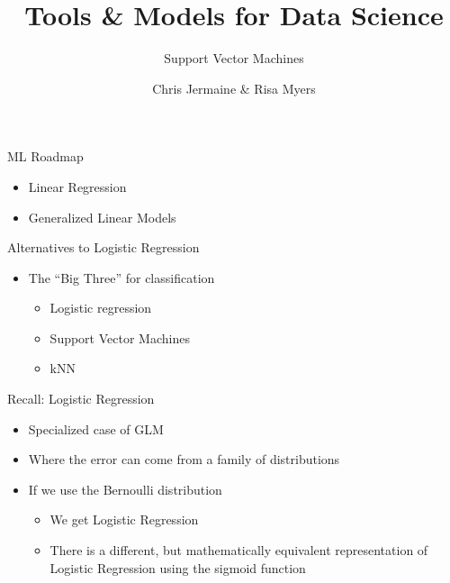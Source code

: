 \documentclass[aspectratio=169]{beamer}
\title[]
{Tools \& Models for Data Science}
\subtitle{Support Vector Machines}
\author[]{Chris Jermaine \& Risa Myers}
\institute
{
  Rice University
}
\date[]{}
\begin{document}
\begin{frame}
 \titlepage
\end{frame}


\begin{frame}{ML Roadmap}

\begin{itemize}
	\item Linear Regression
	\item Generalized Linear Models
\end{itemize}
\end{frame}
\begin{frame}{Alternatives to Logistic Regression}

\begin{itemize}
	\item The ``Big Three'' for classification
        \begin{itemize}
                \item Logistic regression
		\item Support Vector Machines
		\item kNN
        \end{itemize}
\end{itemize}
\end{frame}
\begin{frame}{Recall: Logistic Regression}

\begin{itemize}
\item Specialized case of GLM
\item Where the error can come from a family of distributions
\item If we use the Bernoulli distribution
\begin{itemize}
\item We get Logistic Regression
\item There is a different, but mathematically equivalent representation of Logistic Regression using the sigmoid function
\end{itemize}
\end{itemize}
\end{frame}
\end{document}

